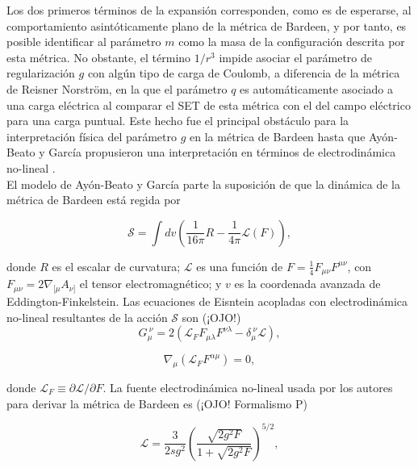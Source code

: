 \documentclass{article}
\numberwithin{equation}{section}
\begin{document}
Los dos primeros términos de la expansión corresponden, como es de esperarse, al comportamiento asintóticamente plano de la métrica de Bardeen, y por tanto, es posible identificar al parámetro $m$ como la masa de la configuración descrita por esta métrica. No obstante, el término $1/r^3$ impide asociar el parámetro  de regularización $g$ con algún tipo de carga de Coulomb, a diferencia de la métrica de Reisner Norström, en la que el parámetro $q$ es automáticamente asociado a una carga eléctrica al comparar el SET de esta métrica con el del campo eléctrico para una carga puntual. Este hecho fue el principal obstáculo para la interpretación física del parámetro $g$ en la métrica de Bardeen hasta que Ayón-Beato y García propusieron una interpretación en términos de electrodinámica no-lineal \cite{ayon-beato2000}.\\

El modelo de Ayón-Beato y García parte la suposición de que la dinámica de la métrica de Bardeen está regida por

\begin{equation}
\mathcal{S} = \int dv \left( \frac{1}{16 \pi}R - \frac{1}{4 \pi}\mathcal{L}(F) \right),
\end{equation}

donde $R$ es el escalar de curvatura; $\mathcal{L}$ es una función de $F = \frac{1}{4}F_{\mu \nu}F^{\mu \nu}$, con $F_{\mu \nu} = 2\nabla_{[\mu}A_{\nu]}$ el tensor electromagnético; y $v$ es la coordenada avanzada de Eddington-Finkelstein. Las ecuaciones de Eisntein acopladas con electrodinámica no-lineal resultantes de la acción $\mathcal{S}$ son (¡OJO!)\\

\begin{equation}
\label{euler lagrange eqns 1}
G_{\mu}^{\ \nu} = 2(\mathcal{L}_{F} F_{\mu \lambda} F^{\nu \lambda} - \delta_{\mu}^{\ \nu} \mathcal{L}),
\end{equation}

\begin{equation}
\label{euler lagrange eqns 2}
\nabla_{\mu}(\mathcal{L}_{F} F^{\alpha \mu}) = 0,
\end{equation}

donde $\mathcal{L}_{F} \equiv \partial \mathcal{L}/\partial F$. La fuente electrodinámica no-lineal usada por los autores para derivar la métrica de Bardeen es (¡OJO! Formalismo P)

\begin{equation}
\label{nonlinear bardeen}
\mathcal{L} = \frac{3}{2sg^2}\left( \frac{\sqrt{2g^2F}}{1 + \sqrt{2g^2F}} \right)^{5/2},
\end{equation}
\end{document}
